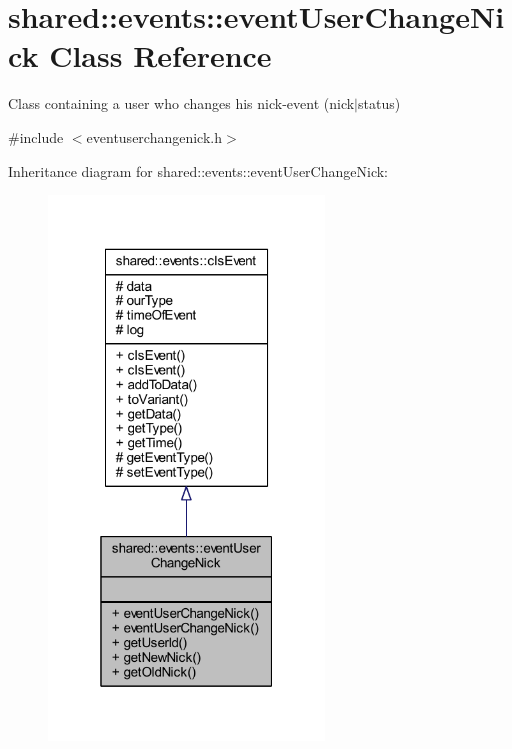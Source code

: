 \hypertarget{classshared_1_1events_1_1event_user_change_nick}{\section{shared\-:\-:events\-:\-:event\-User\-Change\-Nick Class Reference}
\label{d5/de1/classshared_1_1events_1_1event_user_change_nick}
}


Class containing a user who changes his nick-\/event (nick$|$status)  




{\ttfamily \#include $<$eventuserchangenick.\-h$>$}



Inheritance diagram for shared\-:\-:events\-:\-:event\-User\-Change\-Nick\-:\nopagebreak
\begin{figure}[H]
\begin{center}
\leavevmode
\includegraphics[width=208pt]{d0/d37/classshared_1_1events_1_1event_user_change_nick__inherit__graph}
\end{center}
\end{figure}


